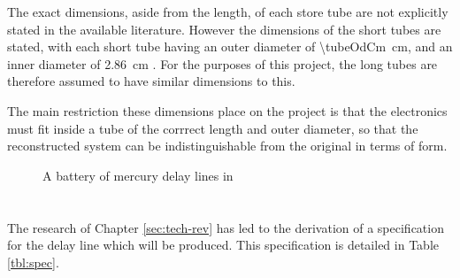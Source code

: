 The exact dimensions, aside from the length, of each store tube are not explicitly stated in the available literature. However the dimensions of the short tubes are stated, with each short tube having an outer diameter of \SI{\tubeOdCm}{\centi\metre}, and an inner diameter of \SI{2.86}{\centi\metre} \cite[p. 213]{wilkes1948}. For the purposes of this project, the long tubes are therefore assumed to have similar dimensions to this.

The main restriction these dimensions place on the project is that the electronics must fit inside a tube of the corrrect length and outer diameter, so that the reconstructed system can be indistinguishable from the original in terms of form.

\begin{figure}[ht]
	\centering
	\caption{A battery of mercury delay lines in  \cite{cam2011c}}
	\label{fig:coffins}
\end{figure}


\chapter{} \label{sec:spec}

The research of Chapter \ref{sec:tech-rev} has led to the derivation of a specification for the delay line which will be produced. This specification is detailed in Table \ref{tbl:spec}.

